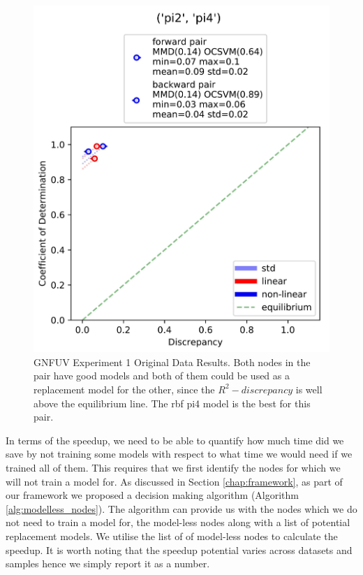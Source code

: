 \documentclass{mpaper}
\begin{document}
\begin{figure}
    \begin{center}
        \includegraphics[scale = 0.085]{experiment_1.jpg}
    \end{center}
    \caption{GNFUV Experiment 1 Original Data Results. Both nodes in the pair have good models and both of them could be used as a replacement model for the other, since the $R^2 - discrepancy$ is well above the equilibrium line. The rbf pi4 model is the best for this pair.}
    \label{fig:gnfuv_exp1}
\end{figure}

In terms of the speedup, we need to be able to quantify how much time did we save by not training some models with respect to what time we would need if we trained all of them. This requires that we first identify the nodes for which we will not train a model for. As discussed in Section \ref{chap:framework}, as part of our framework we proposed a decision making algorithm (Algorithm \ref{alg:modelless_nodes}). The algorithm can provide us with the nodes which we do not need to train a model for, the model-less nodes along with a list of potential replacement models. We utilise the list of of model-less nodes to calculate the speedup. It is worth noting that the speedup potential varies across datasets and samples hence we simply report it as a number.
\end{document}
